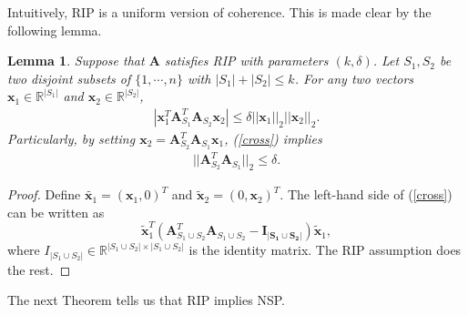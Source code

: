 \documentclass[11pt]{article}
\numberwithin{equation}{section}
\theoremstyle{plain}
\newtheorem{Lemma}[Th]{Lemma}
\theoremstyle{definition}
\def\R{{\mathbb R}}
\def\R{{\mathbb R}}
\def\A{{\mathbf A}}
\def\x{{\mathbf x}}
\begin{document}
Intuitively, RIP is a uniform version of coherence. This is made clear by the following lemma. 

\begin{Lemma}
Suppose that $\A$ satisfies RIP with parameters $(k, \delta)$. Let $S_1, S_2$ be two disjoint subsets of $\{1, \cdots, n\}$ with $|S_1|+|S_2|\leq k$. For any two vectors $\x_1\in\R^{|S_1|}$ and $\x_2\in\R^{|S_2|}$,
\begin{align}
|\x^T_1\A^T_{S_1}\A_{S_2}\x_2|\leq \delta||\x_1||_2||\x_2||_2.\label{cross}
\end{align}
Particularly, by setting $\x_2 = \A^T_{S_2}\A_{S_1}\x_1$, (\ref{cross}) implies  
\begin{align}
||\A^T_{S_2}\A_{S_1}||_2\leq \delta.
\end{align}
\end{Lemma} 

\begin{proof}
Define $\tilde{\x_1} = (\x_1, 0)^T$ and $\tilde{\x}_2 = (0, \x_2)^T$. The left-hand side of (\ref{cross}) can be written as $$\tilde{\x}^T_1(\A^T_{S_1\cup S_2}\A_{S_1\cup S_2}-\mathbf{I_{|S_1\cup S_2|}})\tilde{\x}_1,$$ 
where $I_{|S_1\cup S_2|}\in\R^{|S_1\cup S_2|\times |S_1\cup S_2|}$ is the identity matrix. The RIP assumption does the rest.  
\end{proof}   


The next Theorem tells us that RIP implies NSP. 
\end{document}
